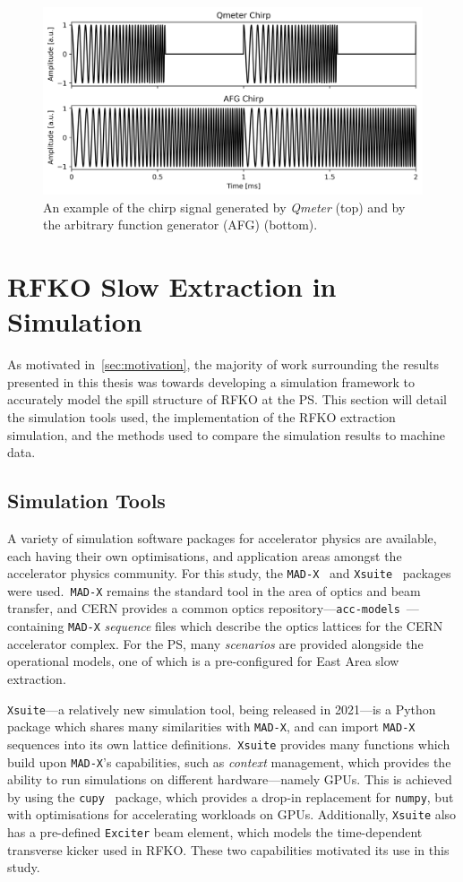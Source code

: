 \documentclass[11pt]{report}
\begin{document}
\begin{figure}
  \centering
  \includegraphics[width=0.6\linewidth]{both-chirps.png}
  \caption{An example of the chirp signal generated by \textit{Qmeter} (top) and by the arbitrary function generator (AFG) (bottom).}\label{eq:both-chirps}
\end{figure}

\section{RFKO Slow Extraction in Simulation}

As motivated in~\autoref{sec:motivation}, the majority of work surrounding the results presented in this thesis was towards developing a simulation framework to accurately model the spill structure of RFKO at the PS. This section will detail the simulation tools used, the implementation of the RFKO extraction simulation, and the methods used to compare the simulation results to machine data.

\subsection{Simulation Tools}

A variety of simulation software packages for accelerator physics are available, each having their own optimisations, and application areas amongst the accelerator physics community. For this study, the \verb|MAD-X|~\cite{Iselin:MAD} and \verb|Xsuite|~\cite{xsuite} packages were used.~\verb|MAD-X| remains the standard tool in the area of optics and beam transfer, and CERN provides a common optics repository---\verb|acc-models|~\cite{optics-repo}---containing \verb|MAD-X| \textit{sequence} files which describe the optics lattices for the CERN accelerator complex. For the PS, many \textit{scenarios} are provided alongside the operational models, one of which is a pre-configured for East Area slow extraction.

\verb|Xsuite|---a relatively new simulation tool, being released in 2021---is a Python package which shares many similarities with \verb|MAD-X|, and can import \verb|MAD-X| sequences into its own lattice definitions.~\verb|Xsuite| provides many functions which build upon \verb|MAD-X|'s capabilities, such as \textit{context} management, which provides the ability to run simulations on different hardware---namely GPUs. This is achieved by using the \verb|cupy|~\cite{CuPy} package, which provides a drop-in replacement for \verb|numpy|, but with optimisations for accelerating workloads on GPUs. Additionally, \verb|Xsuite| also has a pre-defined \verb|Exciter| beam element, which models the time-dependent transverse kicker used in RFKO. These two capabilities motivated its use in this study.
\end{document}
